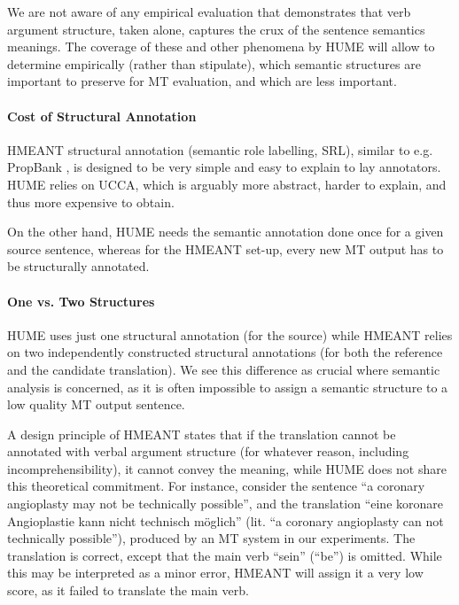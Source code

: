 \documentclass[11pt]{article}
\newcommand{\oa}[1]{}
\def\parcite#1{\cite{#1}}
\begin{document}
We are not aware of any empirical evaluation that demonstrates that verb argument structure,
taken alone, captures the crux of the sentence semantics meanings.
The coverage of
these and other phenomena by HUME will allow to determine empirically
(rather than stipulate), which semantic structures are important
to preserve for MT evaluation, and which are less important.




\paragraph{Cost of Structural Annotation}

HMEANT structural annotation (semantic role labelling, SRL), similar to e.g.
PropBank
\parcite{palmer2010semantic}, is designed to be very simple and easy to explain
to lay annotators.
HUME relies on UCCA, which is arguably more abstract, harder to
explain, and thus more expensive to obtain.

On the other hand, HUME 
needs the semantic annotation
done once for a given source sentence, whereas for the HMEANT set-up, every new
MT output has to be structurally annotated.\oa{we can give some empirical data here.
  In the WMT 13 experiment, Lexi and Barry report a little over 3 mins of annotation
  per sentence + 3 translations. HUME annotation is about 2-4 minutes per sentence.
  UCCA annotation by trained annotators is about 700 tokens/hour (we didn't
  check it for individual sentences), but that's done only once so it should be amortized.}

\paragraph{One vs. Two Structures}

HUME uses just one structural annotation (for the source) while HMEANT relies on
two independently constructed structural annotations (for both the reference and
the candidate translation).
We see this difference as crucial where semantic analysis is concerned, as it
is often impossible to assign a semantic structure to a low quality MT output sentence.

A design principle of HMEANT states that
if the translation cannot be annotated with verbal argument structure
(for whatever reason, including incomprehensibility), it cannot convey the meaning,
while HUME does not share this theoretical commitment.
For instance, consider the sentence ``a coronary angioplasty may not be technically possible'',
and the translation ``eine koronare Angioplastie kann nicht technisch m{\"o}glich''
(lit. ``a coronary angioplasty can not technically possible''),
produced by an MT system in our experiments.
The translation is correct, except that the main verb ``sein'' (``be'') is omitted.
While this may be interpreted as a minor error, HMEANT will assign it a very low score,
as it failed to translate the main verb.
\end{document}
